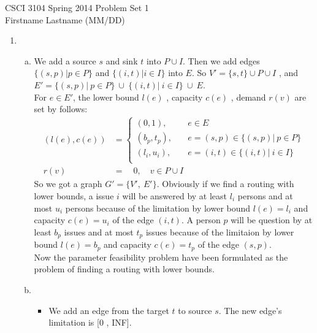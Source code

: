 \documentclass[12pt]{article}
\begin{document}
CSCI 3104 Spring 2014 \hfill Problem Set 1\\
Firstname Lastname (MM/DD) 

\hrulefill


\begin{enumerate}

\item
  \begin{enumerate}[(a)]
  \item
    We add a source $s$ and sink $t$ into $P \cup I$. Then we add edges $\{(s,p)|p \in P \}$ and $\{(i,t)|i \in I\} $ into $E$. So $V' = \{s,t\} \cup P \cup I$ , and $E' = \{(s, p)|\ p \in P \}\ \cup \ \{(i, t) |\ i \in I\}\ \cup \ E$. \\
    For $e \in E'$, the lower bound $l(e)$ , capacity $c(e)$ , demand $r(v)$ are set by follows:
    $$\begin {aligned} (l(e) , c(e))  &= \left \{ 
      \begin{aligned}
         (0,1),      \quad &e \in E \\
         (b_p, t_p), \quad &e = (s, p) \in \{(s, p) | \ p \in P \}  \\
         (l_i, u_i), \quad &e = (i, t) \in \{(i, t) | \ i \in I \} \\  
       \end{aligned}
     \right. \\
     r(v) &= \quad 0, \quad v \in P \cup I
     \end{aligned}
      $$      
    So we got a graph $G' = \{V' ,\ E'\}$. Obviously if we find a routing with lower bounds, a issue $i$ will be answered by at least $l_i$ persons and at most $u_i$ persons because of the limitation by lower bound $l(e) = l_i$ and capacity $c(e) = u_i$ of the edge $(i, t)$. A person $p$ will be question by at least $b_p$ issues and at most $t_p$ issues because of the limitaion by lower bound $l(e) = b_p$ and capacity $c(e) = t_p$ of the edge $(s, p)$. \\
    Now the parameter feasibility problem have been formulated as the problem of finding a routing with lower bounds.
  \item
    \begin{itemize}
    \item We add an edge from the target $t$ to source $s$. The new edge’s limitation is [0 , INF].

\end{itemize}
\end{enumerate}
\end{enumerate}
\end{document}
